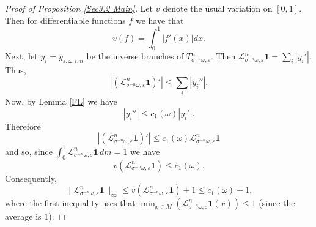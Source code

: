 \documentclass[11pt,reqno,a4paper]{article}
\theoremstyle{special}
\def\om{\omega}
\begin{document}
\begin{proof}[Proof of Proposition \ref{Sec3.2 Main}]
Let $v$ denote the usual variation on $[0,1]$. Then for differentiable functions $f$ we have that 
$$
v(f)=\int_{0}^1|f'(x)|dx.
$$
Next, let $y_i=y_{\varepsilon,\omega,i,n}$ be the inverse branches of $T_{\sigma^{-n}\omega, \varepsilon}^n$. Then
$
\mathcal L_{\sigma^{-n}\omega, \varepsilon}^n\mathbf {1}=\sum_{i}|y_i'|.
$
Thus, 
$$
\left|\left(\mathcal L_{\sigma^{-n}\omega, \varepsilon}^n\mathbf{1}\right)'\right|\leq \sum_{i}|y_i''|.
$$
Now, by Lemma \ref{FL} we have
\begin{equation}\label{Pre Adler0}
|y_i''|\leq c_1(\om)|y_i'|.
\end{equation}
Therefore
$$
\left|\left(\mathcal L_{\sigma^{-n}\omega, \varepsilon}^n\textbf{1}\right)'\right|\leq c_1(\omega)\mathcal L_{\sigma^{-n}\omega, \varepsilon}^n\textbf{1}
$$
and so, since $\int_{0}^1\mathcal L_{\sigma^{-n}\omega, \varepsilon}^n\textbf{1}\, dm=1$ we have 
$$
v(\mathcal L_{\sigma^{-n}\omega, \varepsilon}^n\textbf{1})\leq c_1(\om).
$$
Consequently, 
$$
\|\mathcal L_{\sigma^{-n}\omega, \varepsilon}^n\textbf{1}\|_\infty\leq v(\mathcal L_{\sigma^{-n}\omega, \varepsilon}^n\textbf{1})+1\leq c_1(\om)+1,
$$
where  the first inequality uses that  $\min_{x\in M}(\mathcal L_{\sigma^{-n}\omega, \varepsilon}^n\textbf{1}(x))\leq 1$ (since the average is $1$).
\end{proof}
\end{document}
